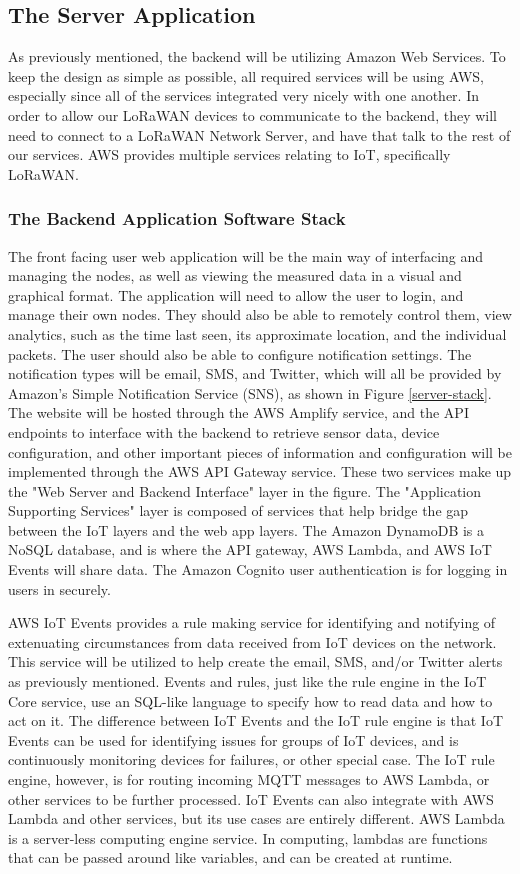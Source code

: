 \subsection{The Server Application}
As previously mentioned, the backend will be utilizing Amazon Web Services. To keep the design as
simple as possible, all required services will be using AWS, especially since all of the services
integrated very nicely with one another. In order to allow our LoRaWAN devices to communicate to the
backend, they will need to connect to a LoRaWAN Network Server, and have that talk to the rest of
our services. AWS provides multiple services relating to IoT, specifically LoRaWAN.

\subsubsection{The Backend Application Software Stack}
The front facing user web application will be the main way of interfacing and managing the nodes, as
well as viewing the measured data in a visual and graphical format. The application will need to
allow the user to login, and manage their own nodes. They should also be able to remotely control
them, view analytics, such as the time last seen, its approximate location, and the individual
packets. The user should also be able to configure notification settings. The notification types
will be email, SMS, and Twitter, which will all be provided by Amazon's Simple Notification Service
(SNS), as shown in Figure \ref{server-stack}. The website will be hosted through the AWS Amplify
service, and the API endpoints to interface with the backend to retrieve sensor data, device
configuration, and other important pieces of information and configuration will be implemented
through the AWS API Gateway service. These two services make up the "Web Server and Backend
Interface" layer in the figure. The "Application Supporting Services" layer is composed of services
that help bridge the gap between the IoT layers and the web app layers. The Amazon DynamoDB is
a NoSQL database, and is where the API gateway, AWS Lambda, and AWS IoT Events will share data. The
Amazon Cognito user authentication is for logging in users in securely. 

AWS IoT Events provides a rule making service for identifying and notifying of extenuating
circumstances from data received from IoT devices on the network. This service will be utilized to
help create the email, SMS, and/or Twitter alerts as previously mentioned. Events and rules, just
like the rule engine in the IoT Core service, use an SQL-like language to specify how to read data
and how to act on it. The difference between IoT Events and the IoT rule engine is that IoT Events
can be used for identifying issues for groups of IoT devices, and is continuously monitoring devices
for failures, or other special case. The IoT rule engine, however, is for routing incoming MQTT
messages to AWS Lambda, or other services to be further processed. IoT Events can also integrate
with AWS Lambda and other services, but its use cases are entirely different. AWS Lambda is
a server-less computing engine service. In computing, lambdas are functions that can be passed
around like variables, and can be created at runtime.

